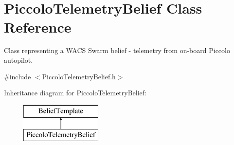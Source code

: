 \hypertarget{class_piccolo_telemetry_belief}{
\section{PiccoloTelemetryBelief Class Reference}
\label{class_piccolo_telemetry_belief}
}


Class representing a WACS Swarm belief -\/ telemetry from on-\/board Piccolo autopilot.  




{\ttfamily \#include $<$PiccoloTelemetryBelief.h$>$}

Inheritance diagram for PiccoloTelemetryBelief:\begin{figure}[H]
\begin{center}
\leavevmode
\includegraphics[height=2.000000cm]{class_piccolo_telemetry_belief}
\end{center}
\end{figure}
